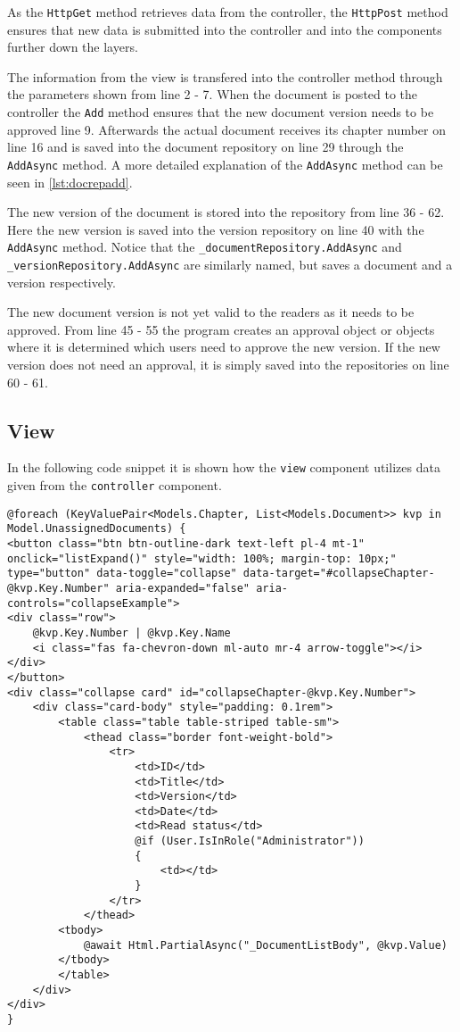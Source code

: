 As the \texttt{HttpGet} method retrieves data from the controller, the \texttt{HttpPost} method ensures that new data is submitted into the controller and into the components further down the layers.

The information from the view is transfered into the controller method through the parameters shown from line 2 - 7.
When the document is posted to the controller the \texttt{Add} method ensures that the new document version needs to be approved line 9.
Afterwards the actual document receives its chapter number on line 16 and is saved into the document repository on line 29 through the \texttt{AddAsync} method.
A more detailed explanation of the \texttt{AddAsync} method can be seen in \cref{lst:docrepadd}.

The new version of the document is stored into the repository from line 36 - 62.
Here the new version is saved into the version repository on line 40 with the \texttt{AddAsync} method.
Notice that the \texttt{_documentRepository.AddAsync} and \texttt{_versionRepository.AddAsync} are similarly named, but saves a document and a version respectively.

The new document version is not yet valid to the readers as it needs to be approved.
From line 45 - 55 the program creates an approval object or objects where it is determined which users need to approve the new version.
If the new version does not need an approval, it is simply saved into the repositories on line 60 - 61.

\subsection{View}

In the following code snippet it is shown how the \texttt{view} component utilizes data given from the \texttt{controller} component.
\\
\begin{lstlisting}[caption={Document View: Index}, label={lst:docview}]
@foreach (KeyValuePair<Models.Chapter, List<Models.Document>> kvp in Model.UnassignedDocuments) {
<button class="btn btn-outline-dark text-left pl-4 mt-1" onclick="listExpand()" style="width: 100%; margin-top: 10px;" type="button" data-toggle="collapse" data-target="#collapseChapter-@kvp.Key.Number" aria-expanded="false" aria-controls="collapseExample">
<div class="row">
	@kvp.Key.Number | @kvp.Key.Name
	<i class="fas fa-chevron-down ml-auto mr-4 arrow-toggle"></i>
</div>
</button>
<div class="collapse card" id="collapseChapter-@kvp.Key.Number">
	<div class="card-body" style="padding: 0.1rem">
		<table class="table table-striped table-sm">
			<thead class="border font-weight-bold">
				<tr>
					<td>ID</td>
					<td>Title</td>
					<td>Version</td>
					<td>Date</td>
					<td>Read status</td>
					@if (User.IsInRole("Administrator"))
					{
						<td></td>
					}
				</tr>
			</thead>
		<tbody>
			@await Html.PartialAsync("_DocumentListBody", @kvp.Value)
		</tbody>
		</table>
	</div>
</div>
}

\end{lstlisting}

